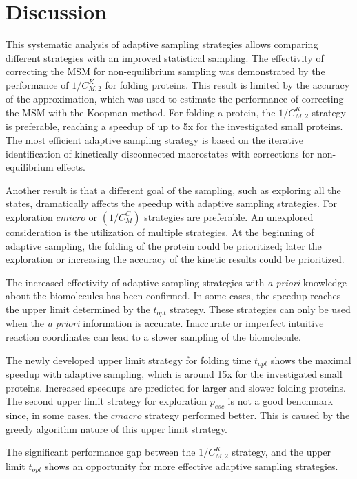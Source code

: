 \section{\label{sec:conclusion}Discussion}


This systematic analysis of adaptive sampling strategies allows comparing different strategies with an improved statistical sampling.
The effectivity of correcting the MSM for non-equilibrium sampling was demonstrated by the performance of $1/C_{M,2}^K$ for folding proteins. This result is limited by the accuracy of the approximation, which was used to estimate the performance of correcting the MSM with the Koopman method. For folding a protein, the $1/C_{M,2}^K$ strategy is preferable, reaching a speedup of up to 5x for the investigated small proteins. The most efficient adaptive sampling strategy is based on the iterative identification of kinetically disconnected macrostates with corrections for non-equilibrium effects.

Another result is that a different goal of the sampling, such as exploring all the states, dramatically affects the speedup with adaptive sampling strategies. For exploration $cmicro$ or  $(1/C_M^C)$ strategies are preferable. 
An unexplored consideration is the utilization of multiple strategies. At the beginning of adaptive sampling, the folding of the protein could be prioritized; later the exploration or increasing the accuracy of the kinetic results could be prioritized.

The increased effectivity of adaptive sampling strategies with \emph{a priori} knowledge about the biomolecules has been confirmed. In some cases, the speedup reaches the upper limit determined by the $t_{opt}$ strategy. These strategies can only be used when the \emph{a priori} information is accurate. Inaccurate or imperfect intuitive reaction coordinates can lead to a slower sampling of the biomolecule.

The newly developed upper limit strategy for folding time $t_{opt}$ shows the maximal speedup with adaptive sampling, which is around 15x for the investigated small proteins. Increased speedups are predicted for larger and slower folding proteins. The second upper limit strategy for exploration $p_{esc}$ is not a good benchmark since, in some cases, the $cmacro$ strategy performed better. This is caused by the greedy algorithm nature of this upper limit strategy.

The significant performance gap between the $1/C_{M,2}^K$ strategy, and the upper limit $t_{opt}$ shows an opportunity for more effective adaptive sampling strategies.

